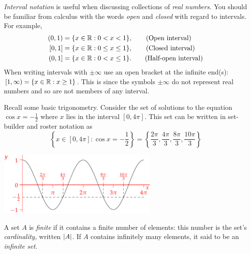 
\emph{Interval notation} is useful when discussing collections of \emph{real numbers.} You should be familiar from calculus with the words \emph{open} and \emph{closed} with regard to intervals. For example,
\begin{align*}
(0,1)&=\{x\in\mathbb{R}:0<x<1\},\tag*{(Open interval)}\\
[0,1]&=\{x\in\mathbb{R}:0\le x\le 1\},\tag*{(Closed interval)}\\
(0,1]&=\{x\in\mathbb{R}:0<x\le 1\}.\tag*{(Half-open interval)}
\end{align*}
When writing intervals with $\pm\infty$ use an open bracket at the infinite end(s): $[1,\infty)=\{x\in\mathbb{R}:x\ge 1\}$. This is since the symbols $\pm\infty$ do not represent real numbers and so are not members of any interval.

\begin{example}{}{}
Recall some basic trigonometry. Consider the set of solutions to the equation $\cos x=-\frac 12$ where $x$ lies in the interval $[0,4\pi]$. This set can be written in set-builder and roster notation as
\[\left\{x\in[0,4\pi]:\cos x=-\frac 12\right\}=\left\{\frac{2\pi}3,\frac{4\pi}3,\frac{8\pi}3,\frac{10\pi}3\right\}\]
\begin{center}
\includegraphics[width=0.6\textwidth]{sets-03-cos}
\end{center}
\end{example}


\begin{defn}{}{}
A set $A$ is \emph{finite} if it contains a finite number of elements: this number is the set's \emph{cardinality,} written $\left| A\right|$. If $A$ contains infinitely many elements, it said to be an \emph{infinite set.}
\end{defn}

